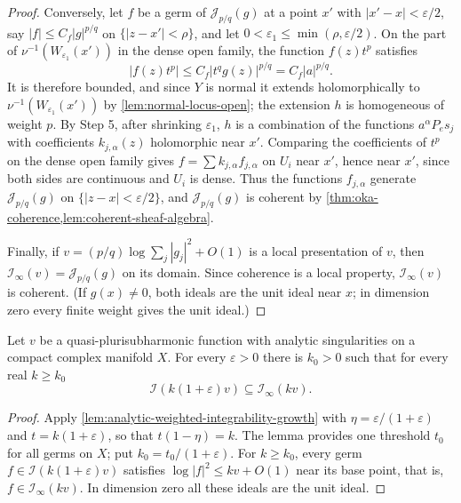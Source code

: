 \begin{proof}
Conversely, let $f$ be a germ of $\mathcal J_{p/q}(g)$ at a point $x'$ with $|x'-x|<\varepsilon/2$, say $|f|\leq C_f|g|^{p/q}$ on $\{|z-x'|<\rho\}$, and let $0<\varepsilon_1\leq\min(\rho,\varepsilon/2)$. On the part of $\nu^{-1}(W_{\varepsilon_1}(x'))$ in the dense open family, the function $f(z)t^p$ satisfies
\[
 |f(z)t^p|\leq C_f|t^qg(z)|^{p/q}=C_f|a|^{p/q}.
\]
It is therefore bounded, and since $Y$ is normal it extends holomorphically to $\nu^{-1}(W_{\varepsilon_1}(x'))$ by \cref{lem:normal-locus-open}; the extension $h$ is homogeneous of weight $p$. By Step 5, after shrinking $\varepsilon_1$, $h$ is a combination of the functions $a^\alpha P_es_j$ with coefficients $k_{j,\alpha}(z)$ holomorphic near $x'$. Comparing the coefficients of $t^p$ on the dense open family gives $f=\sum k_{j,\alpha}f_{j,\alpha}$ on $U_i$ near $x'$, hence near $x'$, since both sides are continuous and $U_i$ is dense. Thus the functions $f_{j,\alpha}$ generate $\mathcal J_{p/q}(g)$ on $\{|z-x|<\varepsilon/2\}$, and $\mathcal J_{p/q}(g)$ is coherent by \cref{thm:oka-coherence,lem:coherent-sheaf-algebra}.

Finally, if $v=(p/q)\log\sum_j|g_j|^2+O(1)$ is a local presentation of $v$, then $\mathcal I_\infty(v)=\mathcal J_{p/q}(g)$ on its domain. Since coherence is a local property, $\mathcal I_\infty(v)$ is coherent. (If $g(x)\neq0$, both ideals are the unit ideal near $x$; in dimension zero every finite weight gives the unit ideal.)
\end{proof}

\begin{corollary}\label{cor:analytic-integrability-bounded-growth}
Let $v$ be a quasi-plurisubharmonic function with analytic singularities on a compact complex manifold $X$. For every $\varepsilon>0$ there is $k_0>0$ such that for every real $k\geq k_0$
\[
 \mathcal I(k(1+\varepsilon)v)\subseteq\mathcal I_\infty(kv).
\]
\end{corollary}
\begin{proof}
Apply \cref{lem:analytic-weighted-integrability-growth} with $\eta=\varepsilon/(1+\varepsilon)$ and $t=k(1+\varepsilon)$, so that $t(1-\eta)=k$. The lemma provides one threshold $t_0$ for all germs on $X$; put $k_0=t_0/(1+\varepsilon)$. For $k\geq k_0$, every germ $f\in\mathcal I(k(1+\varepsilon)v)$ satisfies $\log|f|^2\leq kv+O(1)$ near its base point, that is, $f\in\mathcal I_\infty(kv)$. In dimension zero all these ideals are the unit ideal.
\end{proof}
